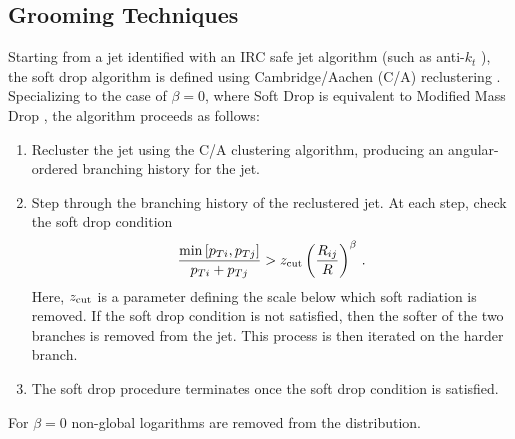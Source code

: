 
\subsection{Grooming Techniques}\label{sec:groom_tech}

Starting from a jet identified with an IRC safe jet algorithm (such as anti-$k_t$ \cite{Cacciari:2008gp}), the soft drop algorithm is defined using Cambridge/Aachen (C/A) reclustering \cite{Dokshitzer:1997in,Wobisch:1998wt,Wobisch:2000dk}.  Specializing to the case of $\beta=0$, where Soft Drop is equivalent to Modified Mass Drop \cite{Dasgupta:2013ihk}, the algorithm proceeds as follows:
\begin{enumerate}

\item Recluster the jet using the C/A clustering algorithm, producing an angular-ordered branching history for the jet.

\item Step through the branching history of the reclustered jet.  At each step, check the soft drop condition
\begin{align}\label{eq:sd_cut}
\frac{\min\left[ p_{Ti}, p_{Tj}  \right]}{p_{Ti}+p_{Tj}}> z_{\rm cut} \left(   \frac{R_{ij}}{R}\right)^\beta \,.
\end{align}
Here, $z_{\rm cut}$ is a parameter defining the scale below which soft radiation is removed.  If the soft drop condition is not satisfied, then the softer of the two branches is removed from the jet.  This process is then iterated on the harder branch.

\item The soft drop procedure terminates once the soft drop condition is satisfied.

\end{enumerate}

For $\beta=0$ non-global logarithms are removed from the distribution.  





